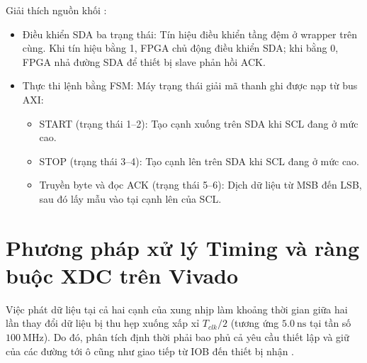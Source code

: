 Giải thích nguồn khối :
\begin{itemize}
    \item {Điều khiển SDA ba trạng thái:} Tín hiệu  điều khiển tầng đệm ở wrapper trên cùng. Khi tín hiệu bằng 1, FPGA chủ động điều khiển SDA; khi bằng 0, FPGA nhả đường SDA để thiết bị slave phản hồi ACK.
    \item {Thực thi lệnh bằng FSM:} Máy trạng thái giải mã thanh ghi  được nạp từ bus AXI:
    \begin{itemize}
        \item {START (trạng thái 1--2):} Tạo cạnh xuống trên SDA khi SCL đang ở mức cao.
        \item {STOP (trạng thái 3--4):} Tạo cạnh lên trên SDA khi SCL đang ở mức cao.
        \item {Truyền byte và đọc ACK (trạng thái 5--6):} Dịch dữ liệu từ MSB đến LSB, sau đó lấy mẫu  vào  tại cạnh lên của SCL.
    \end{itemize}
\end{itemize}

\section{Phương pháp xử lý Timing và ràng buộc XDC trên Vivado}

Việc phát dữ liệu tại cả hai cạnh của xung nhịp làm khoảng thời gian giữa hai lần thay đổi dữ liệu bị thu hẹp xuống xấp xỉ $T_{clk}/2$ (tương ứng $5.0~\text{ns}$ tại tần số $100~\text{MHz}$). Do đó, phân tích định thời phải bao phủ cả yêu cầu thiết lập và giữ của các đường tới ô  cũng như giao tiếp từ IOB đến thiết bị nhận \cite{amd_ug471,amd_ug903}.

